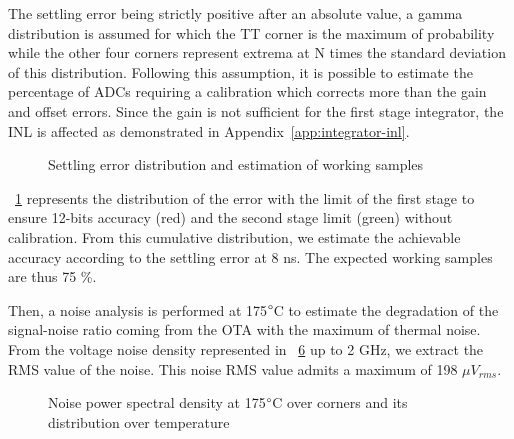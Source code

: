 The settling error being strictly positive after an absolute value, a gamma distribution is assumed for which the TT corner is the maximum of probability while the other four corners represent extrema at N times the standard deviation of this distribution. Following this assumption, it is possible to estimate the percentage of ADCs requiring a calibration which corrects more than the gain and offset errors. Since the gain is not sufficient for the first stage integrator, the INL is affected as demonstrated in Appendix~\ref{app:integrator-inl}.

\begin{figure}[htp]
    \centering
    \begin{subfigure}[b]{0.39\textwidth}
        \resizebox{\textwidth}{!}{
            
        }
        \label{fig:ota_error_dist}
    \end{subfigure}
    \begin{subfigure}[b]{0.58\textwidth}
        \resizebox{\textwidth}{!}{
            
        }
        \label{fig:ota_working_samples}
    \end{subfigure}
    \caption{Settling error distribution and estimation of working samples}
    \label{fig:ota_dist_sample}
\end{figure}

\figurename~\ref{fig:ota_error_dist} represents the distribution of the error with the limit of the first stage to ensure 12-bits accuracy (red) and the second stage limit (green) without calibration. From this cumulative distribution, we estimate the achievable accuracy according to the settling error at 8 ns. The expected working samples are thus 75 \%. 

Then, a noise analysis is performed at 175\(\degree \)C to estimate the degradation of the signal-noise ratio coming from the OTA with the maximum of thermal noise. From the voltage noise density represented in \figurename~\ref{fig:ota_noise_psd} up to 2 GHz, we extract the RMS value of the noise. This noise RMS value admits a maximum of 198 \(\mu V_{rms} \).

\begin{figure}[htp]
    \centering
    \begin{subfigure}[b]{0.43\textwidth}
        \resizebox{\textwidth}{!}{
            
        }
        \label{fig:noise_spectral_density}
    \end{subfigure}
    \begin{subfigure}[b]{0.56\textwidth}
        \resizebox{\textwidth}{!}{
            
        }
        \label{fig:noise_spectral_density}
    \end{subfigure}
    \caption{Noise power spectral density at 175\(\degree \)C over corners and its distribution over temperature}
    \label{fig:ota_noise_psd}
\end{figure}
\clearpage

